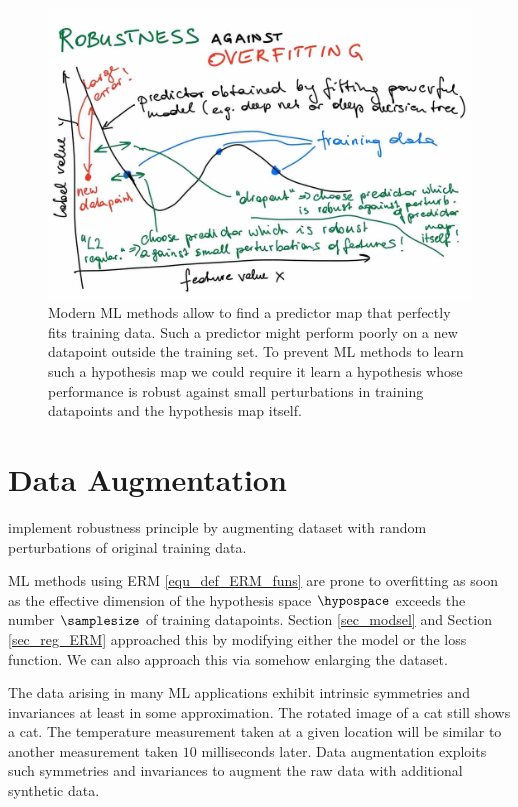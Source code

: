 \documentclass[12pt]{report}
\begin{document}
 \begin{figure}[htbp]
	\centering
	\includegraphics[width=\textwidth]{RobustnessOverfitting.jpg}  
	\caption{Modern ML methods allow to find a predictor map that perfectly fits 
		training data. Such a predictor might perform poorly on a new datapoint 
		outside the training set. To prevent ML methods to learn such a hypothesis  
		map we could require it learn a hypothesis whose performance is robust against 
		small perturbations in training datapoints and the hypothesis map itself.}
	\label{fig_robustness_overfitting}
\end{figure}

\section{Data Augmentation} 
\label{sec_data_augmentation} 
implement robustness principle by augmenting dataset with random perturbations of original training data. 

ML methods using ERM \eqref{equ_def_ERM_funs} are prone to overfitting as soon 
as the effective dimension of the hypothesis space $\hypospace$ exceeds the number 
$\samplesize$ of training datapoints. Section \ref{sec_modsel} and Section \ref{sec_reg_ERM} 
approached this by modifying either the model or the loss function. We can also approach 
this via somehow enlarging the dataset. 

The data arising in many ML applications exhibit intrinsic symmetries and invariances at least in 
some approximation. The rotated image of a cat still shows a cat. The temperature measurement 
taken at a given location will be similar to another measurement taken $10$ milliseconds later. 
Data augmentation exploits such symmetries and invariances to augment the raw data with 
additional synthetic data. 
\end{document}
